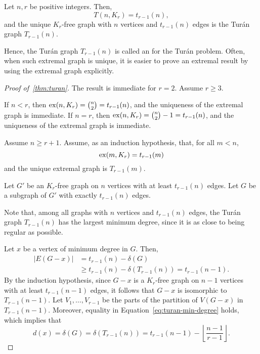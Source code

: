 \begin{theorem} \label{thm:turan}
    Let \(n, r\) be positive integers.
    Then,
    \begin{equation}
        T(n, K_r) = t_{r-1}(n),
    \end{equation}
    and the unique \(K_r\)-free graph with \(n\) vertices and \(t_{r-1}(n)\) edges is the Turán graph \(T_{r-1}(n)\).
\end{theorem}

Hence, the Turán graph \(T_{r-1}(n)\) is called an  for the Turán problem.
Often, when such extremal graph is unique,
it is easier to prove an extremal result by using the extremal graph explicitly.

\begin{proof}[Proof of~\ref{thm:turan}]
    The result is immediate for \(r = 2\).
    Assume \(r \geq 3\).

    If \(n < r\), then \(\operatorname{ex}(n, K_r) = \binom{n}{2} = t_{r-1}(n)\),
    and the uniqueness of the extremal graph is immediate.
    If \(n = r\), then \(\operatorname{ex}(n, K_r) = \binom{n}{2} - 1 = t_{r-1}(n)\),
    and the uniqueness of the extremal graph is immediate.

    Assume \(n \geq r+1\).
    Assume, as an induction hypothesis, that, for all \(m < n\),
    \begin{equation}
        \operatorname{ex}(m, K_r) = t_{r-1}(m)
    \end{equation}
    and the unique extremal graph is \(T_{r-1}(m)\).

    Let \(G'\) be an \(K_r\)-free graph on \(n\) vertices with at least \(t_{r-1}(n)\) edges.
    Let \(G\) be a subgraph of \(G'\) with exactly \(t_{r-1}(n)\) edges.

    Note that, among all graphs with \(n\) vertices and \(t_{r-1}(n)\) edges,
    the Turán graph \(T_{r-1}(n)\) has the largest minimum degree,
    since it is as close to being regular as possible.

    Let \(x\) be a vertex of minimum degree in \(G\).
    Then, 
    \begin{equation} \label{eq:turan-min-degree}
        \begin{aligned}
        |E(G - x)| &= t_{r-1}(n) - \delta(G) \\
                   &\geq t_{r-1}(n) - \delta(T_{r-1}(n)) = t_{r-1}(n-1).
        \end{aligned}
    \end{equation}
    By the induction hypothesis,
    since \(G - x\) is a \(K_r\)-free graph on \(n-1\) vertices with at least \(t_{r-1}(n-1)\) edges,
    it follows that \(G - x\) is isomorphic to \(T_{r-1}(n-1)\).
    Let \(V_1, \dots, V_{r-1}\) be the parts of the partition of \(V(G - x)\) in \(T_{r-1}(n-1)\).
    Moreover, equality in Equation~\ref{eq:turan-min-degree} holds, which implies that
    \begin{equation}
        d(x) = \delta(G) = \delta(T_{r-1}(n)) = 
        t_{r-1}(n-1) - \left\lfloor \frac{n-1}{r-1} \right\rfloor.
    \end{equation}


\end{proof}
